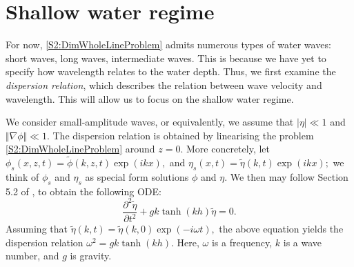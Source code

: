 

\section{Shallow water regime} 
For now, \eqref{S2:DimWholeLineProblem} admits numerous types of water waves: short waves, long waves, intermediate waves. This is because we have yet to specify how wavelength relates to the water depth. Thus, we first examine the \textit{dispersion relation}, which describes the relation between wave velocity and wavelength. This will allow us to focus on the shallow water regime.

We consider small-amplitude waves, or equivalently, we assume that $|\eta| \ll 1$ and $\Vert \nabla \phi \Vert \ll 1.$ The dispersion relation is obtained by linearising the problem \eqref{S2:DimWholeLineProblem} around $z=0.$ More concretely, let $\phi_s(x,z,t) = \tilde{\phi}(k,z,t) \exp(ikx),$ and $\eta_s(x,t) = \tilde{\eta}(k,t)\exp(ikx);$ we think of $\phi_s$ and $\eta_s$ as special form solutions $\phi$ and $\eta.$ We then may follow Section 5.2 of \cite{Ablowitz}, to obtain the following ODE:
\[ 
\frac{\partial^2 \tilde{\eta}}{\partial t^2} + g k \tanh(k h) \tilde{\eta} = 0.
\]
Assuming that $\tilde{\eta}(k,t) = \tilde{\eta}(k, 0) \exp(-i \omega t),$ the above equation yields the dispersion relation $\omega^2 = g k \tanh(k h).$ Here, $\omega$ is a frequency, $k$ is a wave number, and $g$ is gravity. 

